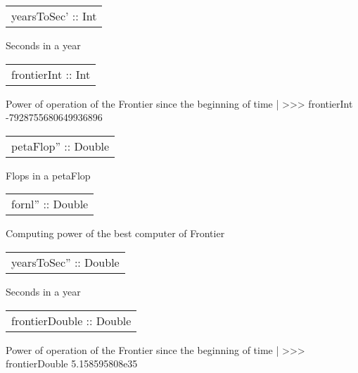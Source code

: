 \begin{haddockdesc}
\item[\begin{tabular}{@{}l}
yearsToSec' :: Int
\end{tabular}]
{\haddockbegindoc
Seconds in a year\par}
\end{haddockdesc}
\begin{haddockdesc}
\item[\begin{tabular}{@{}l}
frontierInt :: Int
\end{tabular}]
{\haddockbegindoc
Power of operation of the Frontier since the beginning of time
 | >>> frontierInt
 -7928755680649936896\par}
\end{haddockdesc}
\begin{haddockdesc}
\item[\begin{tabular}{@{}l}
petaFlop'' :: Double
\end{tabular}]
{\haddockbegindoc
Flops in a petaFlop\par}
\end{haddockdesc}
\begin{haddockdesc}
\item[\begin{tabular}{@{}l}
fornl'' :: Double
\end{tabular}]
{\haddockbegindoc
Computing power of the best computer of Frontier\par}
\end{haddockdesc}
\begin{haddockdesc}
\item[\begin{tabular}{@{}l}
yearsToSec'' :: Double
\end{tabular}]
{\haddockbegindoc
Seconds in a year\par}
\end{haddockdesc}
\begin{haddockdesc}
\item[\begin{tabular}{@{}l}
frontierDouble :: Double
\end{tabular}]
{\haddockbegindoc
Power of operation of the Frontier since the beginning of time
 | >>> frontierDouble
 5.158595808e35\par}
\end{haddockdesc}
